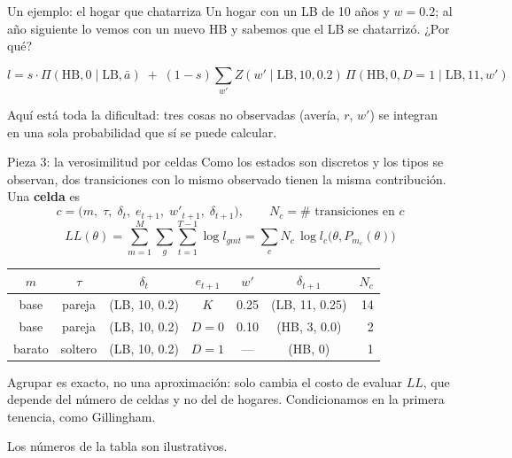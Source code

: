 \documentclass[aspectratio=169,11pt]{beamer}
\newcommand{\idea}[1]{\vspace{-0.3em}\begin{block}{}\centering\small #1\end{block}}
\newcommand{\nota}[1]{\par\vfill{\scriptsize\color{gris}#1}}
\begin{document}
\begin{frame}{Un ejemplo: el hogar que chatarriza}
  Un hogar con un LB de 10 años y $w=0.2$; al año siguiente lo vemos con un nuevo HB y
  sabemos que el LB se chatarrizó. ¿Por qué?
  \medskip
  \centering
  \par\medskip
  \raggedright
  \[
    l=s\cdot\Pi(\text{HB},0\mid\text{LB},\bar a)\;+\;(1-s)\sum_{w'}Z(w'\mid\text{LB},10,0.2)\,
      \Pi(\text{HB},0,D{=}1\mid\text{LB},11,w')
  \]
  \idea{Aquí está toda la dificultad: tres cosas no observadas (avería, $r$, $w'$) se
  integran en una sola probabilidad que sí se puede calcular.}
\end{frame}

\begin{frame}{Pieza 3: la verosimilitud por celdas}
  Como los estados son discretos y los tipos se observan, dos transiciones con lo mismo
  observado tienen la misma contribución. Una \textbf{celda} es
  \[
    c=\big(m,\;\tau,\;\delta_t,\;e_{t+1},\;w'_{t+1},\;\delta_{t+1}\big),
    \qquad N_c=\#\text{ transiciones en }c
  \]
  \vspace{-0.8em}
  \[
    \boxed{\;LL(\theta)=\sum_{m=1}^{M}\sum_{g}\sum_{t=1}^{T-1}\log l_{gmt}
      =\sum_{c}N_c\,\log l_c\big(\theta,P_{m_c}(\theta)\big)\;}
  \]
  \begin{center}\small
  \begin{tabular}{cccccc|r}
    \toprule
    $m$ & $\tau$ & $\delta_t$ & $e_{t+1}$ & $w'$ & $\delta_{t+1}$ & $N_c$\\
    \midrule
    base & pareja & (LB, 10, 0.2) & $K$ & 0.25 & (LB, 11, 0.25) & 14\\
    base & pareja & (LB, 10, 0.2) & $D{=}0$ & 0.10 & (HB, 3, 0.0) & 2\\
    barato & soltero & (LB, 10, 0.2) & $D{=}1$ & --- & (HB, 0) & 1\\
    \bottomrule
  \end{tabular}
  \end{center}
  {\small Agrupar es exacto, no una aproximación: solo cambia el costo de evaluar $LL$,
  que depende del número de celdas y no del de hogares. Condicionamos en la primera
  tenencia, como Gillingham.}
  \nota{Los números de la tabla son ilustrativos.}
\end{frame}
\end{document}
